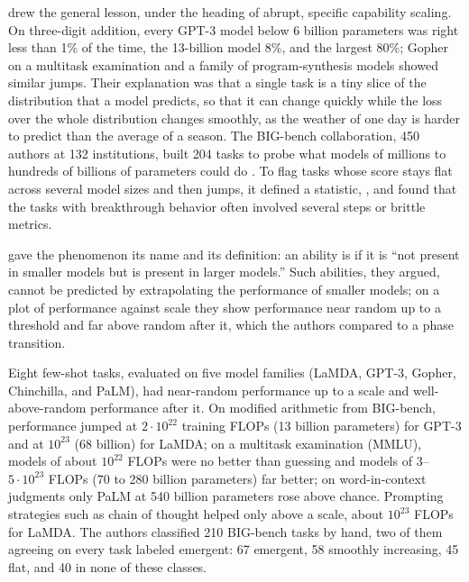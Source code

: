 \begin{refsection}
\Textcite{GanguliEtAl2022} drew the general lesson, under the heading of abrupt, specific capability scaling. On three-digit addition, every GPT-3 model below 6 billion parameters was right less than 1\% of the time, the 13-billion model 8\%, and the largest 80\%; Gopher on a multitask examination and a family of program-synthesis models showed similar jumps. Their explanation was that a single task is a tiny slice of the distribution that a model predicts, so that it can change quickly while the loss over the whole distribution changes smoothly, as the weather of one day is harder to predict than the average of a season. The BIG-bench collaboration, 450 authors at 132 institutions, built 204 tasks to probe what models of millions to hundreds of billions of parameters could do \parencite{SrivastavaEtAl2023}. To flag tasks whose score stays flat across several model sizes and then jumps, it defined a statistic, , and found that the tasks with breakthrough behavior often involved several steps or brittle metrics.

\Textcite{WeiEtAl2022} gave the phenomenon its name and its definition: an ability is  if it is ``not present in smaller models but is present in larger models.'' Such abilities, they argued, cannot be predicted by extrapolating the performance of smaller models; on a plot of performance against scale they show performance near random up to a threshold and far above random after it, which the authors compared to a phase transition.

\begin{finding}\label{fd:emergence:wei}
Eight few-shot tasks, evaluated on five model families (LaMDA, GPT-3, Gopher, Chinchilla, and PaLM), had near-random performance up to a scale and well-above-random performance after it. On modified arithmetic from BIG-bench, performance jumped at $2\cdot10^{22}$ training FLOPs (13 billion parameters) for GPT-3 and at $10^{23}$ (68 billion) for LaMDA; on a multitask examination (MMLU), models of about $10^{22}$ FLOPs were no better than guessing and models of $3$--$5\cdot10^{23}$ FLOPs (70 to 280 billion parameters) far better; on word-in-context judgments only PaLM at 540 billion parameters rose above chance. Prompting strategies such as chain of thought helped only above a scale, about $10^{23}$ FLOPs for LaMDA. The authors classified 210 BIG-bench tasks by hand, two of them agreeing on every task labeled emergent: 67 emergent, 58 smoothly increasing, 45 flat, and 40 in none of these classes.
\end{finding}


\end{refsection}
